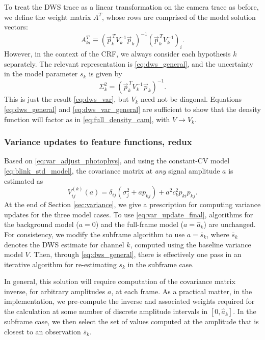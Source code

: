 \documentclass[10pt]{article}
\newcommand{\cv}{{\small CV}}
\newcommand{\dws}{{\small DWS}}
\newcommand{\crf}{{\small CRF}}
\begin{document}
To treat the \dws{} trace as a linear transformation on the camera trace as before, we define the weight matrix $A^T$, whose rows are comprised of the model solution vectors:
$$
A_{ki}^T \equiv (\vec{p}_k^{\,T} V_k^{-1} \vec{p}_k)^{-1} (\vec{p}_k^{\,T} V_k^{-1})_i.
$$
However, in the context of the \crf{}, we always consider each hypothesis $k$ separately.
The relevant representation is \eqref{eq:dws_general}, and the uncertainty in the model parameter $s_k$ is given by~\cite{Lupton1993}
\begin{equation}
\label{eq:dws_var_general}
\Sigma_k^2 = (\vec{p}_k^{\,T} V_k^{-1} \vec{p}_k)^{-1}.
\end{equation}
This is just the result \eqref{eq:dws_var}, but $V_k$ need not be diagonal.  Equations \eqref{eq:dws_general} and \eqref{eq:dws_var_general} are sufficient to show that the density function will factor as in \eqref{eq:full_density_cam}, with $V \rightarrow V_k$. 

\subsubsection{Variance updates to feature functions, redux}
\label{sec:var_updates_redux}
Based on \eqref{eq:var_adjust_photophys}, and using the constant-\cv{} model \eqref{eq:blink_std_model},
the covariance matrix at \emph{any} signal amplitude $a$ is estimated as
\begin{equation}
\label{eq:var_update_final}
V_{ij}^{(k)}(a) = \delta_{ij}(\sigma_j^2 + ap_{kj}) + a^2 c_k^2 p_{ki}p_{kj}.
\end{equation}
At the end of Section \ref{sec:variance}, we give a prescription for computing variance updates for the three model cases.
To use \eqref{eq:var_update_final}, algorithms for the background model ($a=0$) and the full-frame model ($a=\hat{a}_k$) are unchanged.  For consistency, we modify the subframe algorithm to use $a = \bar{s}_k$, where $\bar{s}_k$ denotes the \dws{} estimate for channel $k$, computed using the baseline variance model $V$.  Then, through \eqref{eq:dws_general}, there is effectively one pass in an iterative algorithm for re-estimating $s_k$ in the subframe case.

In general, this solution will require computation of the covariance matrix inverse, for arbitrary amplitudes $a$, at each frame.  As a practical matter, in the implementation, we pre-compute the inverse and associated weights required for the calculation at some number of discrete amplitude intervals in $[0,\hat{a}_k]$.  In the subframe case, we then select the set of values computed at the amplitude that is closest to an observation $\bar{s}_k$.
\end{document}
